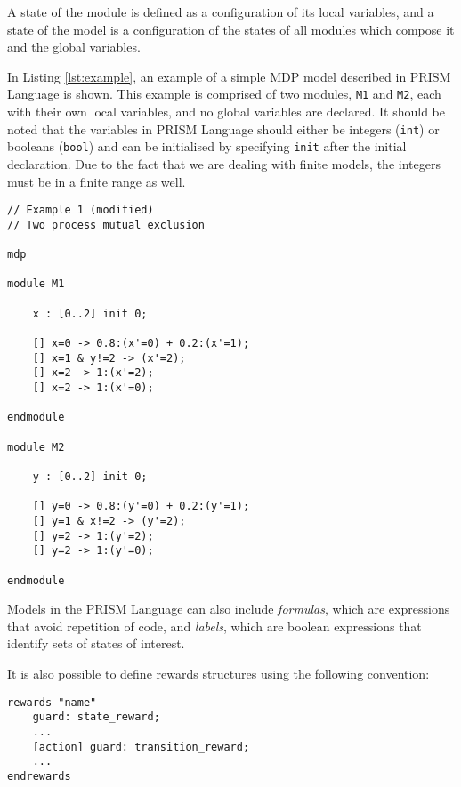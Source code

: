 A state of the module is defined as a configuration of its local variables, and a state of the model is a configuration of the states of all modules which compose it and the global variables.

In Listing \ref{lst:example}, an example of a simple MDP model described in PRISM Language is shown. This example is comprised of two modules, \texttt{M1} and \texttt{M2}, each with their own local variables, and no global variables are declared. It should be noted that the variables in PRISM Language should either be integers (\texttt{int}) or booleans (\texttt{bool}) and can be initialised by specifying \texttt{init} after the initial declaration. Due to the fact that we are dealing with finite models, the integers must be in a finite range as well.

{\vspace{1em}
\begin{lstlisting}[caption={Example of a simple MDP model from \cite{prism_example}},captionpos=b,label={lst:example}]
// Example 1 (modified)
// Two process mutual exclusion

mdp

module M1

    x : [0..2] init 0;

    [] x=0 -> 0.8:(x'=0) + 0.2:(x'=1);
    [] x=1 & y!=2 -> (x'=2);
    [] x=2 -> 1:(x'=2);
    [] x=2 -> 1:(x'=0);

endmodule

module M2

    y : [0..2] init 0;

    [] y=0 -> 0.8:(y'=0) + 0.2:(y'=1);
    [] y=1 & x!=2 -> (y'=2);
    [] y=2 -> 1:(y'=2);
    [] y=2 -> 1:(y'=0);

endmodule
\end{lstlisting}
}

Models in the PRISM Language can also include \textit{formulas}, which are expressions that avoid repetition of code, and \textit{labels}, which are boolean expressions that identify sets of states of interest.

It is also possible to define rewards structures using the following convention:

\begin{minipage}{\linewidth}
{\vspace{1em}
\begin{lstlisting}
rewards "name"
    guard: state_reward;
    ...
    [action] guard: transition_reward;
    ...
endrewards
\end{lstlisting}
}
\end{minipage}

